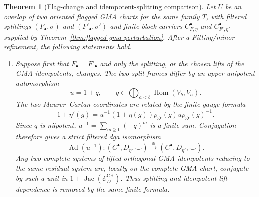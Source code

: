 \documentclass[11pt]{article}
\newtheorem{theorem}{Theorem}[section]
\theoremstyle{definition}
\begin{document}
\begin{theorem}[Flag-change and idempotent-splitting comparison]\label{thm:flag-change-gma-descent}
Let $U$ be an overlap of two oriented flagged GMA charts for the same family $T$,
with filtered splittings $(F_\bullet,\sigma)$ and $(F'_\bullet,\sigma')$ and
finite block carriers $C_{F,\eta}^\bullet$ and $C_{F',\eta'}^\bullet$ supplied by
Theorem~\ref{thm:flagged-gma-perturbation}.  After a Fitting/minor refinement,
the following statements hold.

\begin{enumerate}[label=\textnormal{(\roman*)}]
\item Suppose first that $F_\bullet=F'_\bullet$ and only the splitting, or the
chosen lifts of the GMA idempotents, changes.  The two split frames differ by an
upper-unipotent automorphism
\[
 u=1+q,
 \qquad q\in\bigoplus_{a<b}\operatorname{Hom}(V_b,V_a).
\]
The two Maurer--Cartan coordinates are related by the finite gauge formula
\begin{equation}\label{eq:flag-splitting-gauge}
 1+\eta'(g)
 =u^{-1}(1+\eta(g))\rho_{\mathrm{gr}}(g)
   u\rho_{\mathrm{gr}}(g)^{-1}.
\end{equation}
Since $q$ is nilpotent, $u^{-1}=\sum_{m\ge0}(-q)^m$ is a finite sum.  Conjugation
therefore gives a strict filtered dga isomorphism
\begin{equation}\label{eq:flag-splitting-strict-dga}
 \operatorname{Ad}(u^{-1}):
 (C^\bullet,D_\eta,\smile)
 \xrightarrow{\ \cong\ }
 (C^\bullet,D_{\eta'},\smile).
\end{equation}
Any two complete systems of lifted orthogonal GMA idempotents reducing to the
same residual system are, locally on the complete GMA chart, conjugate by such
a unit in $1+\operatorname{Jac}(\mathcal E^{\mathrm{CH}}_{\bar D})$.  Thus
splitting and idempotent-lift dependence is removed by the same finite formula.


\end{enumerate}
\end{theorem}
\end{document}
